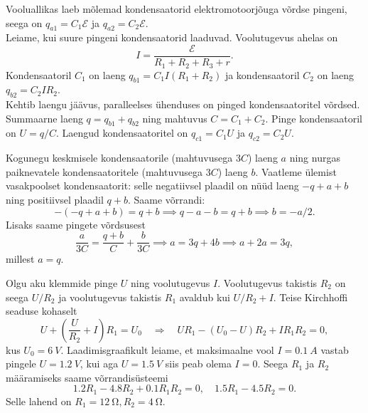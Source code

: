 \documentclass[10pt]{article}
\begin{document}
{%

\solu
\osa Vooluallikas laeb mõlemad kondensaatorid elektromotoorjõuga võrdse pingeni, seega on $q_{a1} = C_1\mathcal E$ ja $q_{a2} = C_2\mathcal E$.\\
\osa Leiame, kui suure pingeni kondensaatorid laaduvad. Voolutugevus ahelas
on
\[
I = \frac{\mathcal E}{R_1+R_2+R_3+r}.
\]
Kondensaatoril $C_1$ on laeng $q_{b1} = C_1I(R_1 + R_2)$ ja kondensaatoril $C_2$ on laeng $q_{b2} = C_2IR_2$.\\
\osa Kehtib laengu jäävus, paralleelses ühenduses on pinged kondensaatoritel võrdsed. Summaarne laeng $q = q_{b1} + q_{b2}$ ning mahtuvus $C = C_1 + C_2$. Pinge kondensaatoril on $U = q/C$. Laengud kondensaatoritel on $q_{c1} = C_1U$ ja $q_{c2} = C_2U$.
\probend
\bigskip


\solu
Kogunegu keskmisele kondensaatorile (mahtuvusega $3C$) laeng $a$ ning nurgas paiknevatele kondensaatoritele (mahtuvusega $3C$) laeng $b$. Vaatleme ülemist vasakpoolset kondensaatorit: selle negatiivsel plaadil on nüüd laeng $-q+a+b$ ning positiivsel plaadil $q+b$. Saame võrrandi:
\[-(-q+a+b)=q+b \implies q-a-b=q+b \implies b=-a/2.\]
Lisaks saame pingete võrdsusest
\[\frac{a}{3C}=\frac{q+b}{C}+\frac{b}{3C}\implies a=3q+4b\implies a+2a=3q,\]
millest $a=q$.
\probend
\bigskip


\solu
Olgu aku klemmide pinge $U$ ning voolutugevus $I$. Voolutugevus takistis $R_2$ on seega $U/R_2$ ja voolutugevus takistis $R_1$ avaldub kui $U/R_2 + I$. Teise Kirchhoffi seaduse kohaselt 
\[
U+\left(\frac{U}{R_{2}}+I\right) R_{1}=U_{0} \quad \Rightarrow \quad U R_{1}-\left(U_{0}-U\right) R_{2}+I R_{1} R_{2}=0,
\]
kus $U_0 = \SI{6}{V}$. Laadimisgraafikult leiame, et maksimaalne vool $I = \SI{0,1}{A}$ vastab pingele $U = \SI{1,2}{V}$, kui aga $U = \SI{1,5}{V}$ siis peab olema $I = 0$. Seega $R_1$ ja $R_2$ määramiseks saame võrrandisüsteemi 
\[
\num{1,2}R_1 - \num{4,8}R_2 + \num{0,1}R_1R_2 = 0, \quad \num{1,5}R_1 - \num{4,5}R_2 = 0. 
\]
Selle lahend on $R_1 = \SI{12}{\ohm}, R_2 = \SI{4}{\ohm}$.
\probend
\bigskip

}
\end{document}
